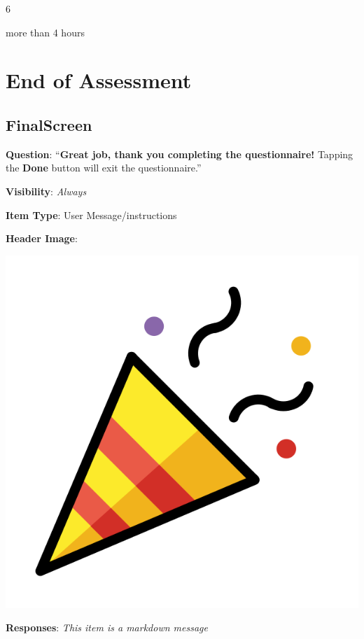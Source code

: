 \documentclass[]{book}
\begin{document}
6

more than 4 hours

\hypertarget{end_section}{%
\chapter{End of Assessment}\label{end_section}}

\hypertarget{finalscreen}{%
\section{FinalScreen}\label{finalscreen}}

\textbf{Question}: ``\textbf{Great job, thank you completing the questionnaire!} Tapping the \textbf{Done} button will exit the questionnaire.''

\textbf{Visibility}: \emph{Always}

\textbf{Item Type}: User Message/instructions

\textbf{Header Image}:

\begin{flushleft}\includegraphics[width=0.33\linewidth]{downloadFigs4latex_NIMH_Applet_Codebook/FinalScreen_headerImg} \end{flushleft}

\textbf{Responses}: \emph{This item is a markdown message}


\end{document}
